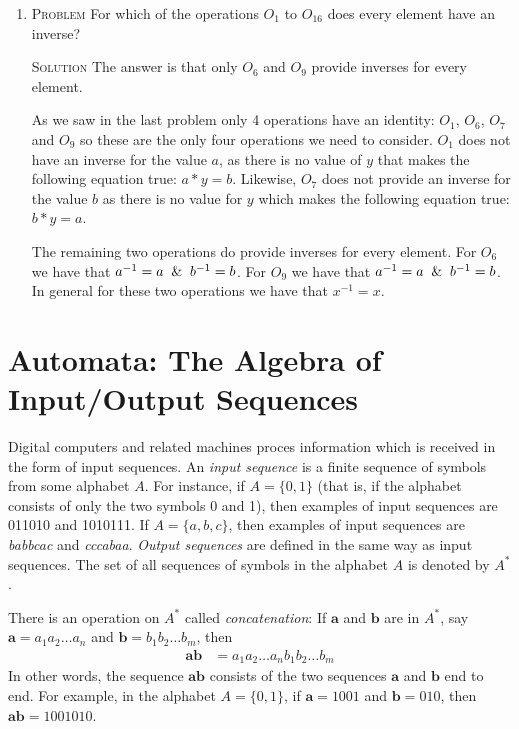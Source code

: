 \documentclass[draft,twoside]{amsart}
\newcommand{\Solution}{\textsc{Solution}\xspace}
\newcommand{\Problem}{\textsc{Problem}\xspace}
\begin{document}
\begin{enumerate}
   \item \Problem For which of the operations $O_1$ to $O_{16}$ does
   every element have an inverse?

   \noindent \Solution The answer is that only $O_6$ and $O_9$ provide
   inverses for every element.
   
   As we saw in the last problem only 4 operations
   have an identity: $O_1$, $O_6$, $O_7$ and $O_9$ so these are the only
   four operations we need to consider. $O_1$ does not have an inverse 
   for the value $a$, as there is no value of $y$ that makes the following
   equation true: $a * y = b$. Likewise, $O_7$ does not provide an inverse
   for the value $b$ as there is no value for $y$ which makes the 
   following equation true: $b * y = a$. 
   
   The remaining two operations do
   provide inverses for every element. For $O_6$ we have that 
   $a^{-1} = a \And b^{-1} = b$. For $O_9$ we have that 
   $a^{-1} = a \And b^{-1} = b$. In general for these two operations
   we have that $x^{-1} = x$.

\end{enumerate}

\section{Automata: The Algebra of Input/Output Sequences}
Digital computers and related machines proces information which is received in
the form of input sequences. An \emph{input sequence} is a finite sequence of
symbols from some alphabet $A$. For instance, if $A=\{0,1\}$ (that is, if the
alphabet consists of only the two symbols 0 and 1), then examples of input
sequences are 011010 and 1010111. If $A=\{a,b,c\}$, then examples of input
sequences are \emph{babbcac} and \emph{cccabaa}. \emph{Output sequences} are
defined in the same way as input sequences. The set of all sequences of symbols
in the alphabet $A$ is denoted by $A^*$.

There is an operation on $A^*$ called \emph{concatenation}: If $\mathbf{a}$ and
$\mathbf{b}$ are in $A^*$, say $\mathbf{a} = a_1 a_2 \ldots a_n$ and
$\mathbf{b} = b_1 b_2 \ldots b_m$, then \begin{align*} \mathbf{ab} & = a_1 a_2
\ldots a_n b_1 b_2 \ldots b_m \end{align*} In other words, the sequence
$\mathbf{ab}$ consists of the two sequences $\mathbf{a}$ and $\mathbf{b}$ end
to end.  For example, in the alphabet $A=\{0,1\}$, if $\mathbf{a} = 1001$ and
$\mathbf{b} = 010$, then $\mathbf{ab} = 1001010$.
\end{document}
